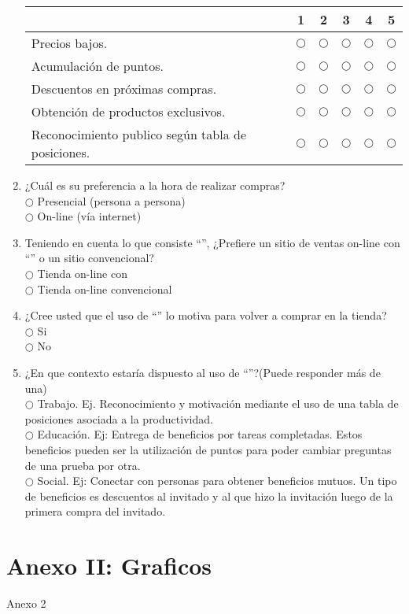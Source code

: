 \begin{enumerate}
\begin{table}[h]
\centering
\begin{tabular}{|l|c|c|c|c|c|}
\hline
 & {\bf 1} & {\bf 2} & {\bf 3} & {\bf 4} & {\bf 5} \\
\hline
Precios bajos. & $\bigcirc$ & $\bigcirc$ & $\bigcirc$ & $\bigcirc$ & $\bigcirc$ \\
\hline
Acumulación de puntos. & $\bigcirc$ & $\bigcirc$ & $\bigcirc$ & $\bigcirc$ & $\bigcirc$ \\
\hline
Descuentos en próximas compras. & $\bigcirc$ & $\bigcirc$ & $\bigcirc$ & $\bigcirc$ & $\bigcirc$ \\
\hline
Obtención de productos exclusivos. & $\bigcirc$ & $\bigcirc$ & $\bigcirc$ & $\bigcirc$ & $\bigcirc$ \\
\hline
Reconocimiento publico según tabla de posiciones. & $\bigcirc$ & $\bigcirc$ & $\bigcirc$ & $\bigcirc$ & $\bigcirc$ \\
\hline
\end{tabular}
\end{table}

\item ¿Cuál es su preferencia a la hora de realizar compras? \\

$\bigcirc$ Presencial (persona a persona) \\
$\bigcirc$ On-line (vía internet)

\item Teniendo en cuenta lo que consiste ``{\gam}'', ¿Prefiere un sitio de ventas on-line con ``{\gam}'' o un sitio convencional? \\

$\bigcirc$ Tienda on-line con {\gam} \\
$\bigcirc$ Tienda on-line convencional

\item ¿Cree usted que el uso de ``{\gam}'' lo motiva para volver a comprar en la tienda? \\

$\bigcirc$ Si \\
$\bigcirc$ No

\item  ¿En que contexto estaría dispuesto al uso de ``{\gam}''?(Puede responder más de una)\\
 
$\bigcirc$ Trabajo. Ej. Reconocimiento y motivación mediante el uso de una tabla de posiciones asociada a la productividad. \\
$\bigcirc$ Educación. Ej: Entrega de beneficios por tareas completadas. Estos beneficios pueden ser la utilización de puntos para poder cambiar preguntas de una prueba por otra. \\
$\bigcirc$  Social. Ej: Conectar con personas para obtener beneficios mutuos. Un tipo de beneficios es descuentos al invitado y al que hizo la invitación luego de la primera compra del invitado.
\end{enumerate}

\section{Anexo II: Graficos }



Anexo 2
